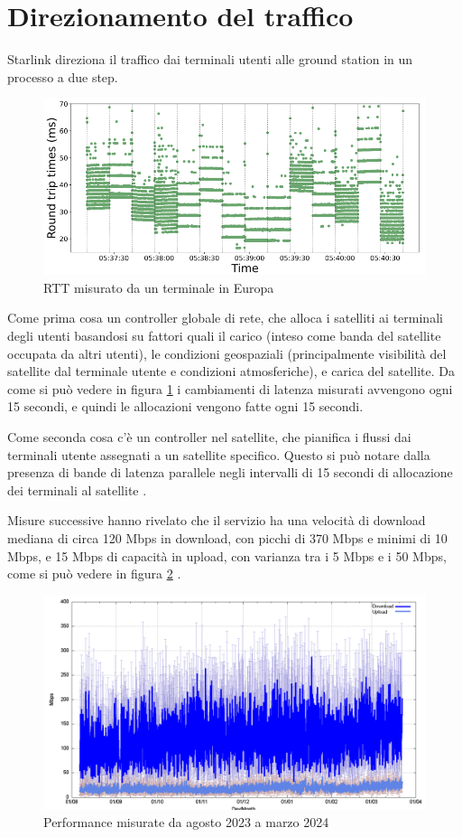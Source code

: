 \section{Direzionamento del traffico}
Starlink direziona il traffico dai terminali utenti alle ground station in un processo a due step.

\begin{figure}[htbp]
  \centering
  \includegraphics[width=0.8\linewidth]{./res/img/rtt_euterminal.png}
  \caption{\ac{RTT} misurato da un terminale in Europa \cite{tanveer_making_2023}}
  \label{fig:rtt-euterminal}
\end{figure}

Come prima cosa un controller globale di rete, che alloca i satelliti ai terminali degli utenti basandosi su fattori quali il carico (inteso come banda del satellite occupata da altri utenti), le condizioni geospaziali (principalmente visibilità del satellite dal terminale utente e condizioni atmosferiche), e carica del satellite.
Da come si può vedere in figura \ref{fig:rtt-euterminal} i cambiamenti di latenza misurati avvengono ogni 15 secondi, e quindi le allocazioni vengono fatte ogni 15 secondi.

Come seconda cosa c'è un controller nel satellite, che pianifica i flussi dai terminali utente assegnati a un satellite specifico.
Questo si può notare dalla presenza di bande di latenza parallele negli intervalli di 15 secondi di allocazione dei terminali al satellite \cite{tanveer_making_2023} \cite{geoff_huston_transport_2024}.

Misure successive hanno rivelato che il servizio ha una velocità di download mediana di circa 120 Mbps in download, con picchi di 370 Mbps e minimi di 10 Mbps, e 15 Mbps di capacità in upload, con varianza tra i 5 Mbps e i 50 Mbps, come si può vedere in figura \ref{fig:starlink-performance} \cite{geoff_huston_transport_2024}.

\begin{figure}[htbp]
  \centering
  \includegraphics[width=0.7\linewidth]{./res/img/starlink_performance.png}
  \caption{Performance misurate da agosto 2023 a marzo 2024}
  \label{fig:starlink-performance}
\end{figure}

